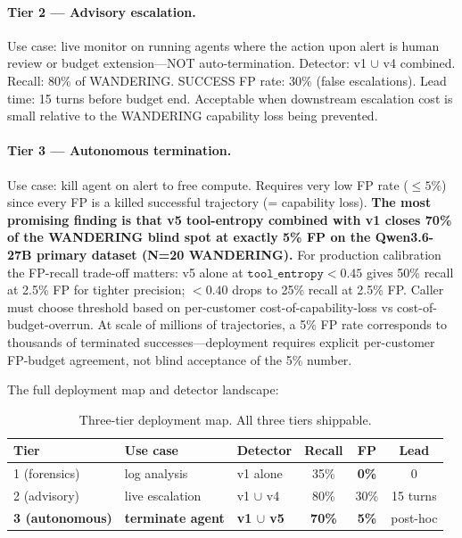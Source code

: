 \documentclass[11pt]{article}
\begin{document}
\paragraph{Tier 2 — Advisory escalation.} Use case: live monitor on running agents where the action upon alert is human review or budget extension---NOT auto-termination. Detector: v1 $\cup$ v4 combined. Recall: 80\% of WANDERING. SUCCESS FP rate: 30\% (false escalations). Lead time: 15 turns before budget end. Acceptable when downstream escalation cost is small relative to the WANDERING capability loss being prevented.

\paragraph{Tier 3 — Autonomous termination.} Use case: kill agent on alert to free compute. Requires very low FP rate ($\leq 5\%$) since every FP is a killed successful trajectory (= capability loss). \textbf{The most promising finding is that v5 tool-entropy combined with v1 closes 70\% of the WANDERING blind spot at exactly 5\% FP on the Qwen3.6-27B primary dataset (N=20 WANDERING).} For production calibration the FP-recall trade-off matters: v5 alone at $\texttt{tool\_entropy}<0.45$ gives 50\% recall at 2.5\% FP for tighter precision; $<0.40$ drops to 25\% recall at 2.5\% FP. Caller must choose threshold based on per-customer cost-of-capability-loss vs cost-of-budget-overrun. At scale of millions of trajectories, a 5\% FP rate corresponds to thousands of terminated successes---deployment requires explicit per-customer FP-budget agreement, not blind acceptance of the 5\% number.

The full deployment map and detector landscape:

\begin{table}[ht]
\centering
\caption{Three-tier deployment map. All three tiers shippable.}
\begin{tabular}{lllccc}
\toprule
Tier & Use case & Detector & Recall & FP & Lead \\
\midrule
1 (forensics) & log analysis & v1 alone & 35\% & \textbf{0\%} & 0 \\
2 (advisory) & live escalation & v1 $\cup$ v4 & 80\% & 30\% & 15 turns \\
\textbf{3 (autonomous)} & \textbf{terminate agent} & \textbf{v1 $\cup$ v5} & \textbf{70\%} & \textbf{5\%} & post-hoc \\
\bottomrule
\end{tabular}
\end{table}
\end{document}
